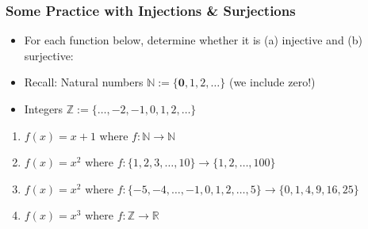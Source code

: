 \begin{frame}
\frametitle{Some Practice with Injections \& Surjections}

\begin{itemize}[<+->]

\item For each function below, determine whether it is (a) injective and (b) surjective:

\item Recall: Natural numbers $\mathbb{N} := \{ \mathbf{0}, 1, 2, \dots \}$ (we include zero!)

\item Integers $\mathbb{Z} := \{ \dots, -2, -1, 0, 1, 2, \dots \}$

\end{itemize}

\begin{enumerate}[<+->]

\item $f(x) = x+1$ where $f: \mathbb{N} \rightarrow \mathbb{N}$

\item $f(x) = x^2$ where $f: \{ 1, 2, 3, \dots, 10 \} \rightarrow \{ 1, 2, \dots, 100 \}$

\item $f(x) = x^2$ where $f: \{ -5, -4, \dots, -1, 0, 1, 2, \dots, 5\} \rightarrow \{ 0, 1, 4, 9, 16, 25 \}$

\item $f(x) = x^3$ where $f: \mathbb{Z} \rightarrow \mathbb{R}$

\end{enumerate}
\end{frame}

